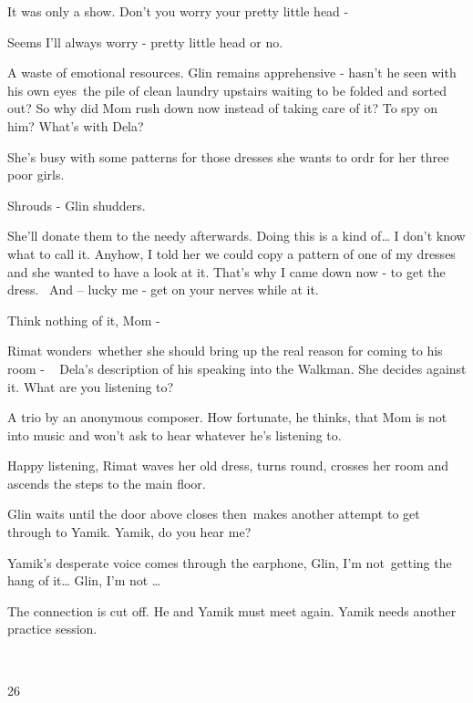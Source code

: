 \documentclass[letterpaper]{article}
\begin{document}
{\textquotedbl}It was only a show. Don't you worry your pretty little head -{\textquotedbl}

{\textquotedbl}Seems I'll always worry - pretty little head or no.{\textquotedbl} 

{\textquotedbl}A waste of emotional resources.{\textquotedbl} Glin remains apprehensive - hasn't he seen with his own
eyes~the pile of clean laundry upstairs waiting to be folded and sorted out? So why did Mom rush down now instead of
taking care of it? To spy on him? {\textquotedbl}What's with Dela?{\textquotedbl}~ 

{\textquotedbl}She's busy with some patterns for those dresses she wants to ordr for her three poor
girls.{\textquotedbl} 

{\textquotedbl}Shrouds - {\textquotedbl} Glin shudders. 

{\textquotedbl}She'll donate them to the needy afterwards. Doing this is a kind of{\dots} I don't know what to call it.
Anyhow, I told her we could copy a pattern of one of my dresses and she wanted to have a look at it. That's why I came
down now - to get the dress. ~And -- lucky me - get on your nerves while at it.{\textquotedbl} 

{\textquotedbl}Think nothing of it, Mom -{\textquotedbl} 

Rimat wonders~whether she should bring up the real reason for coming to his room - ~ Dela's description of his speaking
into the Walkman. She decides against it. {\textquotedbl}What are you listening to?{\textquotedbl} 

{\textquotedbl}A trio by an anonymous composer.{\textquotedbl} How fortunate, he thinks, that Mom is not into music and
won't ask to hear whatever he's listening to. 

{\textquotedbl}Happy listening,{\textquotedbl} Rimat waves her old dress, turns round, crosses her room and ascends the
steps to the main floor.

Glin waits until the door above closes then~makes another attempt to get through to Yamik. {\textquotedbl}Yamik, do you
hear me?{\textquotedbl} 

Yamik's desperate voice comes through the earphone, {\textquotedbl}Glin, I'm not~getting the hang of it{\dots} Glin, I'm
not {\dots}{\textquotedbl} 

The connection is cut off. He and Yamik must meet again. Yamik needs another practice session. 

~

26 
\end{document}
